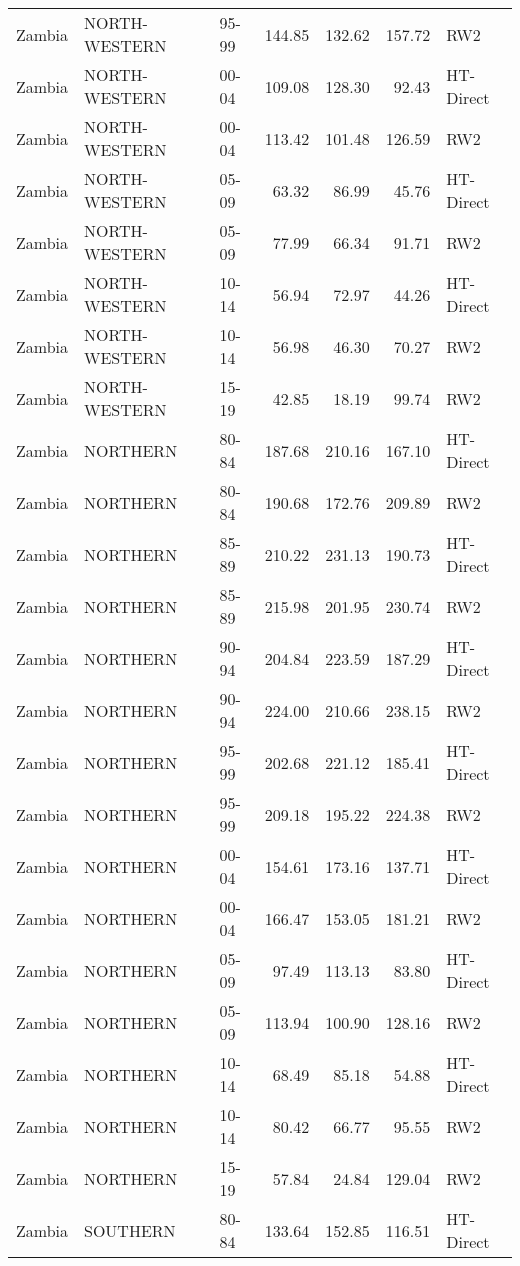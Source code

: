 \begin{longtable}{lllrrrl}
  Zambia & NORTH-WESTERN & 95-99 & 144.85 & 132.62 & 157.72 & RW2 \\ 
  Zambia & NORTH-WESTERN & 00-04 & 109.08 & 128.30 & 92.43 & HT-Direct \\ 
  Zambia & NORTH-WESTERN & 00-04 & 113.42 & 101.48 & 126.59 & RW2 \\ 
  Zambia & NORTH-WESTERN & 05-09 & 63.32 & 86.99 & 45.76 & HT-Direct \\ 
  Zambia & NORTH-WESTERN & 05-09 & 77.99 & 66.34 & 91.71 & RW2 \\ 
  Zambia & NORTH-WESTERN & 10-14 & 56.94 & 72.97 & 44.26 & HT-Direct \\ 
  Zambia & NORTH-WESTERN & 10-14 & 56.98 & 46.30 & 70.27 & RW2 \\ 
  Zambia & NORTH-WESTERN & 15-19 & 42.85 & 18.19 & 99.74 & RW2 \\ 
  Zambia & NORTHERN & 80-84 & 187.68 & 210.16 & 167.10 & HT-Direct \\ 
  Zambia & NORTHERN & 80-84 & 190.68 & 172.76 & 209.89 & RW2 \\ 
  Zambia & NORTHERN & 85-89 & 210.22 & 231.13 & 190.73 & HT-Direct \\ 
  Zambia & NORTHERN & 85-89 & 215.98 & 201.95 & 230.74 & RW2 \\ 
  Zambia & NORTHERN & 90-94 & 204.84 & 223.59 & 187.29 & HT-Direct \\ 
  Zambia & NORTHERN & 90-94 & 224.00 & 210.66 & 238.15 & RW2 \\ 
  Zambia & NORTHERN & 95-99 & 202.68 & 221.12 & 185.41 & HT-Direct \\ 
  Zambia & NORTHERN & 95-99 & 209.18 & 195.22 & 224.38 & RW2 \\ 
  Zambia & NORTHERN & 00-04 & 154.61 & 173.16 & 137.71 & HT-Direct \\ 
  Zambia & NORTHERN & 00-04 & 166.47 & 153.05 & 181.21 & RW2 \\ 
  Zambia & NORTHERN & 05-09 & 97.49 & 113.13 & 83.80 & HT-Direct \\ 
  Zambia & NORTHERN & 05-09 & 113.94 & 100.90 & 128.16 & RW2 \\ 
  Zambia & NORTHERN & 10-14 & 68.49 & 85.18 & 54.88 & HT-Direct \\ 
  Zambia & NORTHERN & 10-14 & 80.42 & 66.77 & 95.55 & RW2 \\ 
  Zambia & NORTHERN & 15-19 & 57.84 & 24.84 & 129.04 & RW2 \\ 
  Zambia & SOUTHERN & 80-84 & 133.64 & 152.85 & 116.51 & HT-Direct \\ 

\end{longtable}
